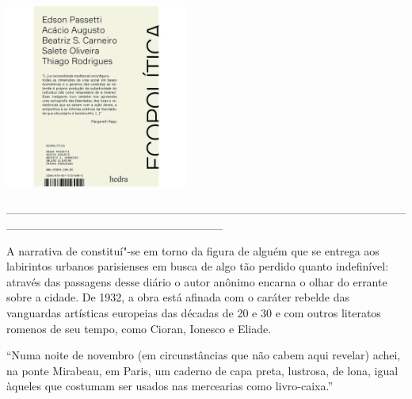 \pagebreak

\hspace{.5cm}

\begin{center}
\hspace*{-.5cm}\includegraphics[width=60mm]{eco.jpeg}
\end{center}

\hspace*{-2cm}\_\_\_\_\_\_\_\_\_\_\_\_\_\_\_\_\_\_\_\_\_\_\_\_\_\_\_\_\_\_\_\_\_\_\_\_\_\_\_\_\_\_\_\_\_\_\_\_\_\_\_\_\_\_\_\_\_\_\_\_\_\_\_\_\_\_\_\_\_\_\_\_\_\_

\medskip

\noindent{}A narrativa de {} constituí"-se em torno da figura de alguém que se entrega aos labirintos urbanos parisienses em busca de algo tão perdido quanto indefinível: através das passagens desse diário o autor anônimo encarna o olhar do errante sobre a cidade. De 1932, a obra está afinada com o caráter rebelde das vanguardas artísticas europeias das décadas de 20 e 30 e com outros literatos romenos de seu tempo, como Cioran, Ionesco e Eliade.

\hspace{.5cm}

\hspace*{-.4cm}\begin{minipage}[c]{0.45\linewidth}
\small{
{}}
\end{minipage}
\begin{minipage}[c]{0.50\linewidth}
\small{``Numa noite de novembro (em circunstâncias que não cabem aqui revelar) achei, na ponte Mirabeau, em Paris, um caderno de capa preta, lustrosa, de lona, igual àqueles que costumam ser usados nas mercearias como livro-caixa.''} 
\end{minipage}

\pagebreak
